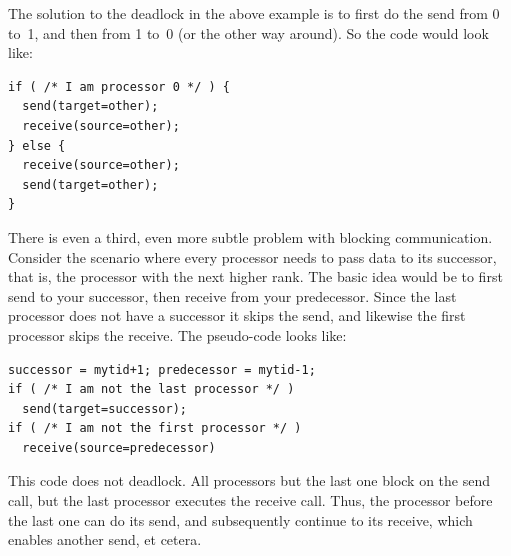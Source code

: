 The solution to the deadlock in the above example
is to first do the send from 0 to~1, and then from 1 to~0 (or the other way around). So the code would look like:
\begin{verbatim}
if ( /* I am processor 0 */ ) {
  send(target=other);
  receive(source=other);
} else {
  receive(source=other);
  send(target=other);
}
\end{verbatim}

There is even a third, even more subtle problem with blocking
communication. Consider the scenario where every processor needs to
pass data to its successor, that is, the processor with the next
higher rank. The basic idea would be to first send to your successor,
then receive from your predecessor. Since the last processor does not
have a successor it skips the send, and likewise the first processor
skips the receive. The pseudo-code looks like:
\begin{verbatim}
successor = mytid+1; predecessor = mytid-1;
if ( /* I am not the last processor */ )
  send(target=successor);
if ( /* I am not the first processor */ )
  receive(source=predecessor)
\end{verbatim}
This code does not deadlock. All processors but the last one block on
the send call, but the last processor executes the receive call. Thus,
the processor before the last one can do its send, and subsequently
continue to its receive, which enables another send, et cetera.


